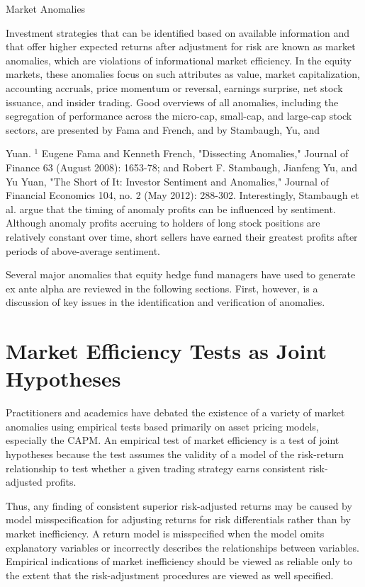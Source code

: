\documentclass[11pt]{article}
\begin{document}
Market Anomalies

Investment strategies that can be identified based on available information and that offer higher expected returns after adjustment for risk are known as market anomalies, which are violations of informational market efficiency. In the equity markets, these anomalies focus on such attributes as value, market capitalization, accounting accruals, price momentum or reversal, earnings surprise, net stock issuance, and insider trading. Good overviews of all anomalies, including the segregation of performance across the micro-cap, small-cap, and large-cap stock sectors, are presented by Fama and French, and by Stambaugh, Yu, and

Yuan. ${ }^{1}$ Eugene Fama and Kenneth French, "Dissecting Anomalies," Journal of Finance 63 (August 2008): 1653-78; and Robert F. Stambaugh, Jianfeng Yu, and Yu Yuan, "The Short of It: Investor Sentiment and Anomalies," Journal of Financial Economics 104, no. 2 (May 2012): 288-302. Interestingly, Stambaugh et al. argue that the timing of anomaly profits can be influenced by sentiment. Although anomaly profits accruing to holders of long stock positions are relatively constant over time, short sellers have earned their greatest profits after periods of above-average sentiment.

Several major anomalies that equity hedge fund managers have used to generate ex ante alpha are reviewed in the following sections. First, however, is a discussion of key issues in the identification and verification of anomalies.

\section*{Market Efficiency Tests as Joint Hypotheses}
Practitioners and academics have debated the existence of a variety of market anomalies using empirical tests based primarily on asset pricing models, especially the CAPM. An empirical test of market efficiency is a test of joint hypotheses because the test assumes the validity of a model of the risk-return relationship to test whether a given trading strategy earns consistent risk-adjusted profits.

Thus, any finding of consistent superior risk-adjusted returns may be caused by model misspecification for adjusting returns for risk differentials rather than by market inefficiency. A return model is misspecified when the model omits explanatory variables or incorrectly describes the relationships between variables. Empirical indications of market inefficiency should be viewed as reliable only to the extent that the risk-adjustment procedures are viewed as well specified.
\end{document}
